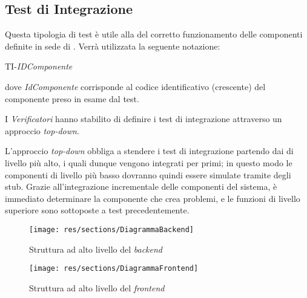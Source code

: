 \newpage
\subsection{Test di Integrazione}
Questa tipologia di test è utile alla  del corretto funzionamento delle componenti definite in sede di \SpecificaTecnica.
Verrà utilizzata la seguente notazione:
	\begin{center}
		TI-\textit{IDComponente}
	\end{center}
dove \textit{IdComponente} corrisponde al codice identificativo (crescente) del componente preso in esame
dal test.

I \textit{Verificatori} hanno stabilito di definire i test di integrazione attraverso un approccio  \textit{top-down}. 


L'approccio \textit{top-down} obbliga a stendere i test di integrazione partendo dai 
di livello più alto, i quali dunque vengono integrati per primi;
in questo modo le componenti di livello più basso dovranno quindi essere simulate tramite degli
stub. Grazie all'integrazione incrementale delle componenti del sistema, è immediato determinare
la componente che crea problemi, e le funzioni di livello superiore sono sottoposte a test precedentemente.

\begin{figure}[H]
      \begin{center}
        \texttt{[image: res/sections/DiagrammaBackend]}
      \caption{Struttura ad alto livello del \textit{backend}}
      \end{center}
\end{figure}

\begin{figure}[H]

        \centering
        \texttt{[image: res/sections/DiagrammaFrontend]}
        \caption{Struttura ad alto livello del \textit{frontend}}
\end{figure}





